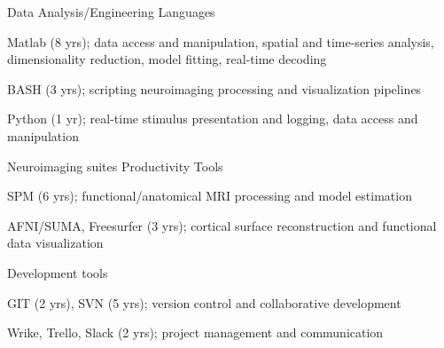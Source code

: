 \vspace*{-0.25cm}

\vspace*{0.3cm}

\begin{cventries}

\cventry
    {Data Analysis/Engineering} %
    {Languages} %
    {\vspace*{-0.05cm}}
    {\vspace*{-0.05cm}} %
    {
      \begin{cvitems} %
        \item {Matlab (8 yrs); data access and manipulation, spatial and time-series analysis, dimensionality reduction, model fitting, real-time decoding}
        \item {BASH (3 yrs); scripting neuroimaging processing and visualization pipelines}
        \item {Python (1 yr); real-time stimulus presentation and logging, data access and manipulation}
      \end{cvitems}
    }
    \vspace*{0.1cm}

\cventry
    {Neuroimaging suites} %
    {Productivity Tools} %
    {\vspace*{-0.05cm}}
    {\vspace*{-0.05cm}} %
    {
      \begin{cvitems} %
        \item {SPM (6 yrs); functional/anatomical MRI processing and model estimation}
        \item {AFNI/SUMA, Freesurfer (3 yrs); cortical surface reconstruction and functional data visualization}
      \end{cvitems}
    }
    \vspace*{-0.2cm}
\cventry
	{Development tools}
	{\vspace*{-0.05cm}}
    {\vspace*{-0.05cm}}
    {\vspace*{-0.05cm}} %
    {
      \begin{cvitems} %
      	\item {GIT (2 yrs), SVN (5 yrs); version control and collaborative development}
      	\item {Wrike, Trello, Slack (2 yrs); project management and communication}
      \end{cvitems}
    }
    \vspace*{-0.2cm}
\end{cventries}
